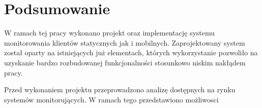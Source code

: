 \chapter{Podsumowanie}
\label{chap:Podsumowanie}

W ramach tej pracy wykonano projekt oraz implementację systemu
monitorowania klientów statycznych jak i mobilnych. Zaprojektowany
system został oparty na istniejących już elementach, których
wykorzystanie pozwoliło na uzyskanie bardzo rozbudowanej
funkcjonalności stosunkowo niskim nakłądem pracy.

Przed wykonaniem projektu przeprowadzono analizę dostępnych na rynku
systemów monitorujących. W ramach tego przedstawiono możliwosci 
